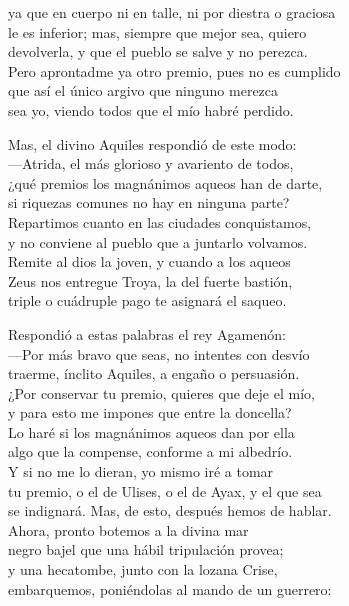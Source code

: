 ya que en cuerpo ni en talle, ni por diestra o graciosa\\
le es inferior; mas, siempre que mejor sea, quiero\\
devolverla, y que el pueblo se salve y no perezca.\\
Pero aprontadme ya otro premio, pues no es cumplido\\
que así el único argivo que ninguno merezca\\
sea yo, viendo todos que el mío habré perdido.\par
Mas, el divino Aquiles respondió de este modo:\\
---Atrida, el más glorioso y avariento de todos,\\
¿qué premios los magnánimos aqueos han de darte,\\
si riquezas comunes no hay en ninguna parte?\\
Repartimos cuanto en las ciudades conquistamos,\\
y no conviene al pueblo que a juntarlo volvamos.\\
Remite al dios la joven, y cuando a los aqueos\\
Zeus nos entregue Troya, la del fuerte bastión,\\
triple o cuádruple pago te asignará el saqueo.\par
Respondió a estas palabras el rey Agamenón:\\
---Por más bravo que seas, no intentes con desvío\\
traerme, ínclito Aquiles, a engaño o persuasión.\\
¿Por conservar tu premio, quieres que deje el mío,\\
y para esto me impones que entre la doncella?\\
Lo haré si los magnánimos aqueos dan por ella\\
algo que la compense, conforme a mi albedrío.\\
Y si no me lo dieran, yo mismo iré a tomar\\
tu premio, o el de Ulises, o el de Ayax, y el que sea\\
se indignará. Mas, de esto, después hemos de hablar.\\
Ahora, pronto botemos a la divina mar\\
negro bajel que una hábil tripulación provea;\\
y una hecatombe, junto con la lozana Crise,\\
embarquemos, poniéndolas al mando de un guerrero:\\
